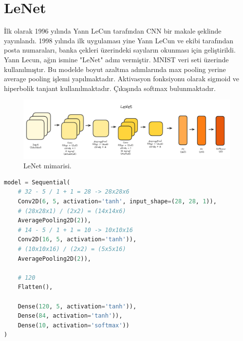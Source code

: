 \section{LeNet}
İlk olarak 1996 yılında Yann LeCun tarafından CNN bir makale şeklinde yayınlandı. 1998 yılında ilk uygulaması yine Yann LeCun ve ekibi tarafından posta numaraları, banka çekleri üzerindeki sayıların okunması için geliştirildi. Yann Lecun, ağın ismine "LeNet" adını vermiştir. MNIST veri seti üzerinde kullanılmıştır. Bu modelde boyut azaltma adımlarında max pooling yerine average pooling işlemi yapılmaktadır. Aktivasyon fonksiyonu olarak sigmoid ve hiperbolik tanjant kullanılmaktadır. Çıkışında softmax bulunmaktadır.

\begin{figure}[h]
    \centering
    \includegraphics[width=1\textwidth]{images/lenet.png}
    \caption{LeNet mimarisi.}
    \label{fig:enter-label}
\end{figure}

\begin{lstlisting}[language=Python]
model = Sequential(
	# 32 - 5 / 1 + 1 = 28 -> 28x28x6
	Conv2D(6, 5, activation='tanh', input_shape=(28, 28, 1)),
	# (28x28x1) / (2x2) = (14x14x6)
	AveragePooling2D(2)),
	# 14 - 5 / 1 + 1 = 10 -> 10x10x16
	Conv2D(16, 5, activation='tanh')),
	# (10x10x16) / (2x2) = (5x5x16)
	AveragePooling2D(2)),

	# 120
	Flatten(),

	Dense(120, 5, activation='tanh')),
	Dense(84, activation='tanh')),
	Dense(10, activation='softmax'))
)
\end{lstlisting}

\newpage
